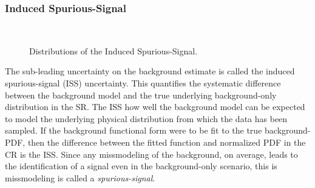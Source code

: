 \subsubsection{Induced Spurious-Signal}
\begin{figure}[h!]
\captionsetup[subfigure]{position=b}
\centering
{}
 \\
\caption{Distributions of the Induced Spurious-Signal.}
\label{fig:ciBkgIssSyst}
\end{figure}

The sub-leading uncertainty on the background estimate is called the induced spurious-signal (ISS) uncertainty.
This quantifies the systematic difference between the background model and the true underlying background-only distribution in the SR.
The ISS how well the background model can be expected to model the underlying physical distribution from which the data has been sampled.
If the background functional form were to be fit to the true background-PDF, then the difference between the fitted function and normalized PDF in the CR is the ISS.
Since any missmodeling of the background, on average, leads to the identification of a signal even in the background-only scenario, this is missmodeling is called a \emph{spurious-signal}.

